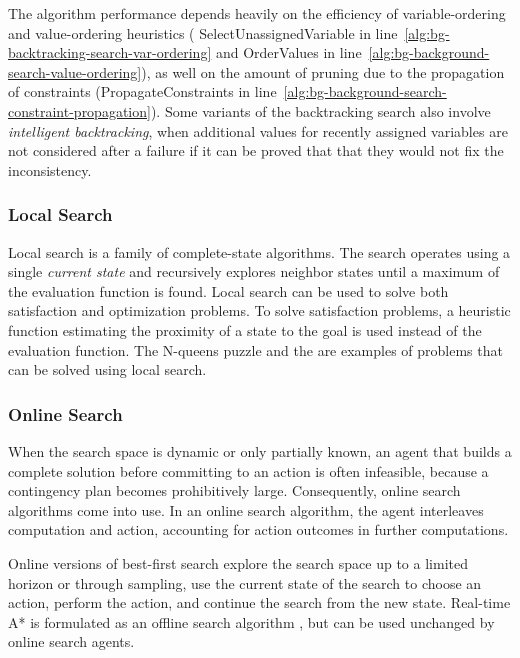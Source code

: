 The algorithm performance depends heavily on the efficiency of
variable-ordering and value-ordering heuristics ({\sc
  SelectUnassignedVariable} in
line~\ref{alg:bg-backtracking-search-var-ordering}
and {\sc  OrderValues} in
line~\ref{alg:bg-background-search-value-ordering}), as well on the
amount of pruning due to the propagation of constraints
({\sc PropagateConstraints} in line~\ref{alg:bg-background-search-constraint-propagation}). Some
variants of the backtracking search also involve {\em intelligent
  backtracking}, when additional values for recently assigned
variables are not considered after a failure if it can be proved
that that they would not fix the inconsistency.

\subsubsection{Local Search}

Local search is a family of complete-state algorithms. The search
operates using a single {\em current state} and recursively explores
neighbor states until a maximum of the evaluation function is
found. Local search can be used to solve both satisfaction and
optimization problems. To solve satisfaction problems, a heuristic
function estimating the proximity of a state to the goal is used instead
of the evaluation function. The N-queens puzzle and the  are examples of problems that can be solved using local
search.

\subsubsection{Online Search}

When the search space is dynamic or only partially known, an agent
that builds a complete solution before committing to an action is
often infeasible, because a contingency plan becomes prohibitively
large. Consequently, online search algorithms come into use. In an
online search algorithm, the agent interleaves computation and action,
accounting for action outcomes in further computations.

Online versions of best-first search explore the search space up to a
limited horizon or through sampling, use the current state
of the search to choose an action, perform the action, and continue
the search from the new state. Real-time A* is formulated as an offline
 search algorithm , but can
be used unchanged by online search agents. 

